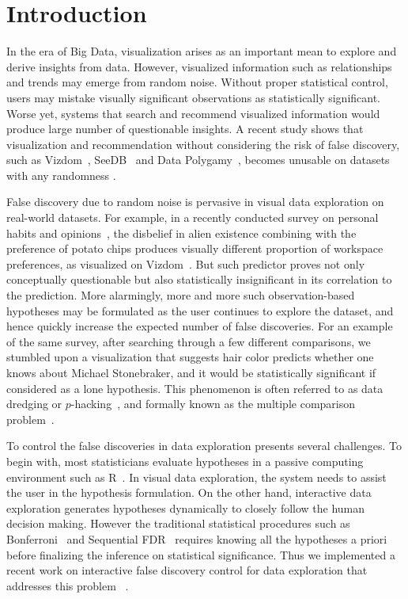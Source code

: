\section{Introduction}
\label{sec:intro}
 In the era of Big Data, visualization arises as an important mean to explore and derive insights from data.  However, visualized information such as relationships and trends may emerge from random noise.  Without proper statistical control, users may mistake visually significant observations as statistically significant.  Worse yet, systems that search and recommend visualized information would produce large number of questionable insights.  
A recent study shows that visualization and recommendation without considering the risk of false discovery, such as Vizdom~\cite{vizdom}, SeeDB~\cite{seedb} and Data Polygamy~\cite{polygamy}, becomes unusable on datasets with any randomness \cite{towards-sustainable-insight}.

 False discovery due to random noise is pervasive in visual data exploration on real-world datasets. For example, in a recently conducted survey on personal habits and opinions~\cite{towards-sustainable-insight}, the disbelief in alien existence combining with the preference of potato chips produces visually different proportion of workspace preferences, as visualized on Vizdom~\cite{vizdom}.  But such predictor proves not only conceptually questionable but also statistically insignificant in its correlation to the prediction.  More alarmingly, more and more such observation-based hypotheses may be formulated as the user continues to explore the dataset, and hence quickly increase the expected number of false discoveries. For an example of the same survey, after searching through a few different comparisons, we stumbled upon a visualization that suggests hair color predicts whether one knows about Michael Stonebraker, and it would be statistically significant if considered as a lone hypothesis. This phenomenon is often referred to as data dredging or $p$-hacking~\cite{p-hacking}, and formally known as the multiple comparison problem~\cite{shaffer1995multiple}.

To control the false discoveries in data exploration presents several challenges.  To begin with, most statisticians evaluate hypotheses in a passive computing environment such as R~\cite{R}. In visual data exploration, the system needs to assist the user in the hypothesis formulation.  On the other hand, interactive data exploration generates hypotheses dynamically to closely follow the human decision making.  However the traditional statistical procedures such as Bonferroni~\cite{bonferroni1936teoria} and Sequential FDR~\cite{seq-fdr} requires knowing all the hypotheses a priori before finalizing the inference on statistical significance.  Thus we implemented a recent work on interactive false discovery control for data exploration that addresses this problem ~\cite{controlling-false-discoveries}.  


